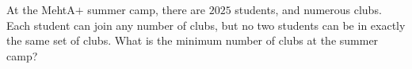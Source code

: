 At the MehtA$+$ summer camp, there are $2025$ students, and numerous clubs. Each student can join any number of clubs, but no two students can be in exactly the same set of clubs. What is the minimum number of clubs at the summer camp?
